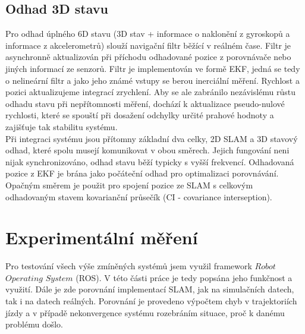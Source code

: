 \documentclass[12pt]{article}
\begin{document}
\subsection{Odhad 3D stavu}
Pro odhad úplného 6D stavu (3D stav + informace o naklonění z gyroskopů a informace z akcelerometrů) slouží navigační filtr běžící v reálném čase. Filtr je asynchronně aktualizován při příchodu odhadované pozice z porovnávače nebo jiných informací ze senzorů. Filtr je implementován ve formě EKF, jedná se tedy o nelineární filtr a jako jeho známé vstupy se berou inerciální měření. Rychlost a pozici aktualizujeme integrací zrychlení. Aby se ale zabránilo nezávislému růstu odhadu stavu při nepřítomnosti měření, dochází k aktualizace pseudo-nulové rychlosti, které se spouští při dosažení odchylky určité prahové hodnoty a zajišťuje tak stabilitu systému.\\
\indent Při integraci systému jsou přítomny základní dva celky, 2D SLAM a 3D stavový odhad, které spolu musejí komunikovat v obou směrech. Jejich fungování neni nijak synchronizováno, odhad stavu běží typicky s vyšší frekvencí. Odhadovaná pozice z EKF je brána jako počáteční odhad pro optimalizaci porovnávání. Opačným směrem je použit pro spojení pozice ze SLAM s celkovým odhadovaným stavem kovarianční průsečík (CI - covariance interseption).


\newpage


\section{Experimentální měření}
Pro testování všech výše zmíněných systémů jsem využil framework $Robot$ $Operating$ $System$ (ROS). V této části práce je tedy popsána jeho funkčnost a využití. Dále je zde porovnání implementací SLAM, jak na simulačních datech, tak i na datech reálných. Porovnání je provedeno výpočtem chyb v trajektoriích jízdy a v případě nekonvergence systému rozebráním situace, proč k danému problému došlo.
\end{document}
